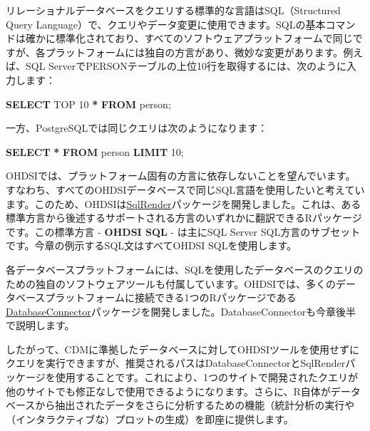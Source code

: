 \documentclass[
  11pt]{book}
\newenvironment{Shaded}{\begin{snugshade}}{\end{snugshade}}
\newcommand{\DecValTok}[1]{\textcolor[rgb]{0.00,0.00,0.81}{#1}}
\newcommand{\KeywordTok}[1]{\textcolor[rgb]{0.13,0.29,0.53}{\textbf{#1}}}
\newcommand{\NormalTok}[1]{#1}
\newcommand{\OperatorTok}[1]{\textcolor[rgb]{0.81,0.36,0.00}{\textbf{#1}}}
\theoremstyle{definition}
\theoremstyle{definition}
\theoremstyle{definition}
\theoremstyle{definition}
\theoremstyle{remark}
\begin{document}
リレーショナルデータベースをクエリする標準的な言語はSQL（Structured Query Language）で、クエリやデータ変更に使用できます。SQLの基本コマンドは確かに標準化されており、すべてのソフトウェアプラットフォームで同じですが、各プラットフォームには独自の方言があり、微妙な変更があります。例えば、SQL ServerでPERSONテーブルの上位10行を取得するには、次のように入力します：  

\begin{Shaded}
\begin{Highlighting}[]
\KeywordTok{SELECT}\NormalTok{ TOP }\DecValTok{10} \OperatorTok{*} \KeywordTok{FROM}\NormalTok{ person;}
\end{Highlighting}
\end{Shaded}

一方、PostgreSQLでは同じクエリは次のようになります：

\begin{Shaded}
\begin{Highlighting}[]
\KeywordTok{SELECT} \OperatorTok{*} \KeywordTok{FROM}\NormalTok{ person }\KeywordTok{LIMIT} \DecValTok{10}\NormalTok{;}
\end{Highlighting}
\end{Shaded}

OHDSIでは、プラットフォーム固有の方言に依存しないことを望んでいます。すなわち、すべてのOHDSIデータベースで同じSQL言語を使用したいと考えています。このため、OHDSIは\href{https://ohdsi.github.io/SqlRender/}{SqlRender}パッケージを開発しました。これは、ある標準方言から後述するサポートされる方言のいずれかに翻訳できるRパッケージです。この標準方言 - \textbf{OHDSI SQL} - は主にSQL Server SQL方言のサブセットです。今章の例示するSQL文はすべてOHDSI SQLを使用します。    

各データベースプラットフォームには、SQLを使用したデータベースのクエリのための独自のソフトウェアツールも付属しています。OHDSIでは、多くのデータベースプラットフォームに接続できる1つのRパッケージである\href{https://ohdsi.github.io/DatabaseConnector/}{DatabaseConnector}パッケージを開発しました。DatabaseConnectorも今章後半で説明します。 

したがって、CDMに準拠したデータベースに対してOHDSIツールを使用せずにクエリを実行できますが、推奨されるパスはDatabaseConnectorとSqlRenderパッケージを使用することです。これにより、1つのサイトで開発されたクエリが他のサイトでも修正なしで使用できるようになります。さらに、R自体がデータベースから抽出されたデータをさらに分析するための機能（統計分析の実行や（インタラクティブな）プロットの生成）を即座に提供します。 
\end{document}
